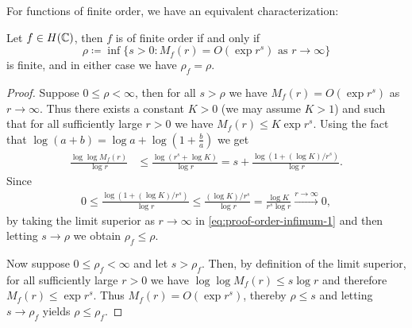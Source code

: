 For functions of finite order, we have an equivalent characterization:

\begin{proposition} \label{prop:order-infimum}
    Let $f \in H(\mathbb{C})$, then $f$ is of finite order if and only if
    \begin{equation}
        \rho \coloneqq \inf \{ s > 0 : M_f(r) = O(\exp r^s) \textrm{ as } r \to \infty \}
    \end{equation}
    is finite, and in either case we have $\rho_f = \rho$.
\end{proposition}

\begin{proof}
    Suppose $0 \leq \rho < \infty$, then for all $s > \rho$ we have $M_f(r) = O(\exp r^s)$ as $r \to \infty$. Thus there exists a constant $K > 0$ (we may assume $K > 1$) and such that for all sufficiently large $r > 0$ we have $M_f(r) \leq K \exp r^s$. Using the fact that $\log (a+b) = \log a + \log (1 + \frac{b}{a})$ we get
    \begin{align*}
        \frac{\log \log M_f(r)}{\log r} &\leq \frac{\log (r^s + \log K)}{\log r} = s + \frac{\log (1 + (\log K) / r^s)}{\log r}. \tag{\textasteriskcentered} \label{eq:proof-order-infimum-1}
    \end{align*}
    Since
    \begin{align*}
        0 \leq \frac{\log (1 + (\log K) / r^s)}{\log r} \leq \frac{(\log K) / r^s}{\log r} = \frac{\log K}{r^s \log r} \xrightarrow{r \to \infty} 0,
    \end{align*}
    by taking the limit superior as $r \to \infty$ in \eqref{eq:proof-order-infimum-1} and then letting $s \to \rho$ we obtain $\rho_f \leq \rho$.

    Now suppose $0 \leq \rho_f < \infty$ and let $s > \rho_f$. Then, by definition of the limit superior, for all sufficiently large $r > 0$ we have $ \log \log M_f(r) \leq s \log r$ and therefore $M_f(r) \leq \exp r^s$. Thus $M_f(r) = O(\exp r^s)$, thereby $\rho \leq s$ and letting $s \to \rho_f$ yields $\rho \leq \rho_f$.
\end{proof}

